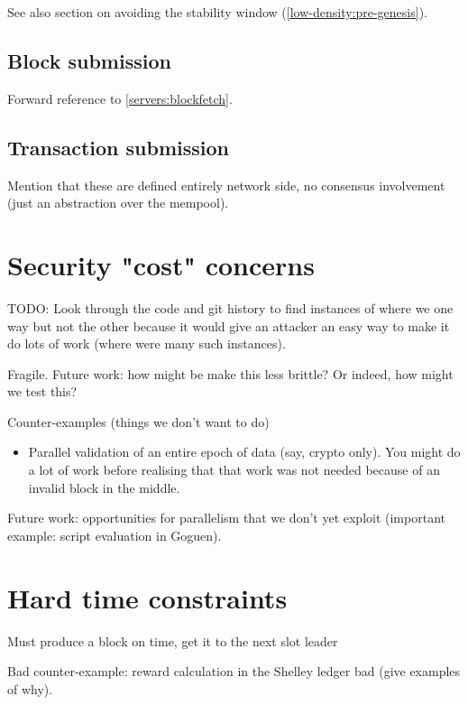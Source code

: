 See also section on avoiding the stability window
(\cref{low-density:pre-genesis}).

\subsection{Block submission}
\label{nonfunctional:network:blocksubmission}

Forward reference to \cref{servers:blockfetch}.

\subsection{Transaction submission}
\label{nonfunctional:network:txsubmission}

Mention that these are defined entirely network side, no consensus involvement
(just an abstraction over the mempool).

\section{Security "cost" concerns}

TODO: Look through the code and git history to find instances of where we
one way but not the other because it would give an attacker an easy way to
make it do lots of work (where were many such instances).

Fragile. Future work: how might be make this less brittle?
Or indeed, how might we test this?

Counter-examples (things we don't want to do)

\begin{itemize}
\item Parallel validation of an entire epoch of data (say, crypto only).
You might do a lot of work before realising that that work was not needed because
of an invalid block in the middle.
\end{itemize}

Future work: opportunities for parallelism that we don't yet exploit
(important example: script evaluation in Goguen).

\section{Hard time constraints}

Must produce a block on time, get it to the next slot leader

Bad counter-example: reward calculation in the Shelley ledger bad
(give examples of why).

